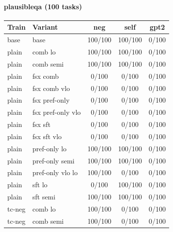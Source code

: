 \documentclass[10pt,landscape]{article}
\begin{document}
\paragraph{plausibleqa (100 tasks)}
\begin{tabular}{llccc}
\toprule
Train & Variant & neg & self & gpt2 \\
\midrule
base & base & \cellcolor{done}100/100 & \cellcolor{done}100/100 & \cellcolor{missing}0/100 \\
plain & comb lo & \cellcolor{done}100/100 & \cellcolor{done}100/100 & \cellcolor{missing}0/100 \\
plain & comb semi & \cellcolor{done}100/100 & \cellcolor{done}100/100 & \cellcolor{missing}0/100 \\
plain & fsx comb & \cellcolor{missing}0/100 & \cellcolor{missing}0/100 & \cellcolor{missing}0/100 \\
plain & fsx comb vlo & \cellcolor{missing}0/100 & \cellcolor{missing}0/100 & \cellcolor{missing}0/100 \\
plain & fsx pref-only & \cellcolor{missing}0/100 & \cellcolor{missing}0/100 & \cellcolor{missing}0/100 \\
plain & fsx pref-only vlo & \cellcolor{missing}0/100 & \cellcolor{missing}0/100 & \cellcolor{missing}0/100 \\
plain & fsx sft & \cellcolor{missing}0/100 & \cellcolor{missing}0/100 & \cellcolor{missing}0/100 \\
plain & fsx sft vlo & \cellcolor{missing}0/100 & \cellcolor{missing}0/100 & \cellcolor{missing}0/100 \\
plain & pref-only lo & \cellcolor{done}100/100 & \cellcolor{done}100/100 & \cellcolor{missing}0/100 \\
plain & pref-only semi & \cellcolor{done}100/100 & \cellcolor{done}100/100 & \cellcolor{missing}0/100 \\
plain & pref-only vlo lo & \cellcolor{done}100/100 & \cellcolor{missing}0/100 & \cellcolor{missing}0/100 \\
plain & sft lo & \cellcolor{missing}0/100 & \cellcolor{done}100/100 & \cellcolor{missing}0/100 \\
plain & sft semi & \cellcolor{done}100/100 & \cellcolor{done}100/100 & \cellcolor{missing}0/100 \\
tc-neg & comb lo & \cellcolor{done}100/100 & \cellcolor{missing}0/100 & \cellcolor{missing}0/100 \\
tc-neg & comb semi & \cellcolor{done}100/100 & \cellcolor{missing}0/100 & \cellcolor{missing}0/100 \\

\end{tabular}
\end{document}
